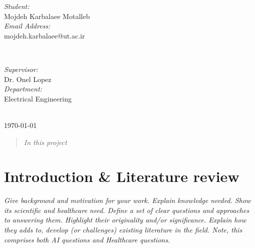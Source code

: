 \begin{titlepage}

\begin{minipage}{0.4\textwidth}
\begin{flushleft} \large
\emph{Student:}\\
Mojdeh Karbalaee Motalleb \\ %
\emph{Email Address:}\\
mojdeh.karbalaee@ut.ac.ir
\end{flushleft}
\end{minipage}
~
\begin{minipage}{0.5\textwidth}
\begin{flushright} \large
\emph{Supervisor:} \\
Dr. Onel Lopez \\%
\emph{Department: } \\
Electrical Engineering
\end{flushright}
\end{minipage}\\[1cm]


{\large \today}\\[0.5cm] %

\vfill %

\end{titlepage}

\begin{abstract}
\emph{In this project }
\end{abstract}

\section{Introduction \& Literature review}
\emph{Give background and motivation for your work. Explain  knowledge needed. Show its scientific and healthcare need.
Define a set of clear questions and approaches to answering them. Highlight their originality and/or significance. Explain how they adds to, develop (or challenges) existing literature in the field. Note, this comprises both AI questions and Healthcare questions.}
